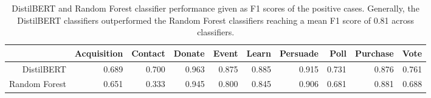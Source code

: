 \begin{table}[ht]
\centering
\begin{tabular}{rrrrrrrrrr}
  \hline
 & Acquisition & Contact & Donate & Event & Learn & Persuade & Poll & Purchase & Vote \\ 
  \hline
DistilBERT & 0.689 & 0.700 & 0.963 & 0.875 & 0.885 & 0.915 & 0.731 & 0.876 & 0.761 \\ 
  Random Forest & 0.651 & 0.333 & 0.945 & 0.800 & 0.845 & 0.906 & 0.681 & 0.881 & 0.688 \\ 
   \hline
\end{tabular}
\caption{DistilBERT and Random Forest classifier performance given as F1 scores of the positive cases. Generally, the DistilBERT classifiers outperformed the Random Forest classifiers reaching a mean F1 score of 0.81 across classifiers.} 
\label{model_performance_positive}
\end{table}
